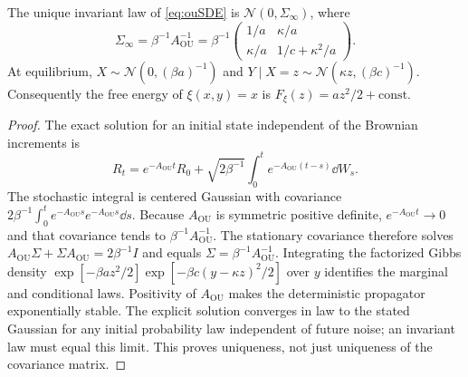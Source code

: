 \documentclass[12pt,a4paper,oneside]{book}
\begin{document}
\begin{proposition}
\label{prop:oueq}
The unique invariant law of \eqref{eq:ouSDE} is
$\mathcal N(0,\Sigma_\infty)$, where
\begin{equation*}
\Sigma_\infty=\beta^{-1}A_{\mathrm{OU}}^{-1}
 =\beta^{-1}\begin{pmatrix}
 1/a&\kappa/a\\[2pt]\kappa/a&1/c+\kappa^2/a
 \end{pmatrix}.
\end{equation*}
At equilibrium,
$X\sim\mathcal N(0,(\beta a)^{-1})$ and
$Y\mid X=z\sim\mathcal N(\kappa z,(\beta c)^{-1})$.
Consequently the free energy of $\xi(x,y)=x$ is
$F_\xi(z)=az^2/2+\mathrm{const}$.
\end{proposition}
\begin{proof}
The exact solution for an initial state independent of the Brownian
increments is
\begin{equation*}
R_t=e^{-A_{\mathrm{OU}}t}R_0+\sqrt{2\beta^{-1}}\int_0^t e^{-A_{\mathrm{OU}}(t-s)}\dd W_s.
\end{equation*}
The stochastic integral is centered Gaussian with covariance
$2\beta^{-1}\int_0^t e^{-A_{\mathrm{OU}}s}e^{-A_{\mathrm{OU}}s}\dd s$.
Because $A_{\mathrm{OU}}$ is symmetric positive definite, $e^{-A_{\mathrm{OU}}t}\to0$ and that
covariance tends to $\beta^{-1}A_{\mathrm{OU}}^{-1}$. The stationary covariance
therefore solves $A_{\mathrm{OU}}\Sigma+\Sigma A_{\mathrm{OU}}=2\beta^{-1}I$ and equals
$\Sigma=\beta^{-1}A_{\mathrm{OU}}^{-1}$. Integrating the factorized Gibbs density
$\exp[-\beta az^2/2]\exp[-\beta c(y-\kappa z)^2/2]$
over $y$ identifies the marginal and conditional laws. Positivity of
$A_{\mathrm{OU}}$ makes the deterministic propagator exponentially stable. The
explicit solution converges in law to the stated Gaussian for any
initial probability law independent of future noise; an invariant law
must equal this limit. This proves uniqueness, not just uniqueness of
the covariance matrix.
\end{proof}
\end{document}

